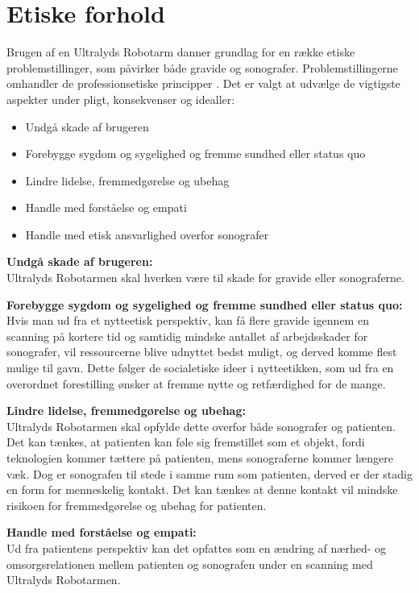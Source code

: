 \section{Etiske forhold}
Brugen af en Ultralyds Robotarm danner grundlag for en række etiske problemstillinger, som påvirker både gravide og sonografer. 
Problemstillingerne omhandler de professionsetiske principper \cite{Husted}. Det er valgt at udvælge de vigtigste aspekter under pligt, konsekvenser og idealler: 
\begin{itemize}
		\item Undgå skade af brugeren
		\item Forebygge sygdom og sygelighed og fremme sundhed eller status quo
		\item Lindre lidelse, fremmedgørelse og ubehag
		\item Handle med forståelse og empati
		\item Handle med etisk ansvarlighed overfor sonografer 
\end{itemize} 

\textbf{Undgå skade af brugeren:} \\
Ultralyds Robotarmen skal hverken være til skade for gravide eller sonograferne.

\textbf{Forebygge sygdom og sygelighed og fremme sundhed eller status quo:} \\
Hvis man ud fra et nytteetisk perspektiv, kan få flere gravide igennem en scanning på kortere tid og samtidig mindske antallet af arbejdsskader for sonografer, vil ressourcerne blive udnyttet bedst muligt, og derved komme flest mulige til gavn. Dette følger de socialetiske ideer i nytteetikken, som ud fra en overordnet forestilling ønsker at fremme nytte og retfærdighed for de mange.
    
\textbf{Lindre lidelse, fremmedgørelse og ubehag:}\\
Ultralyds Robotarmen skal opfylde dette overfor både sonografer og patienten. Det kan tænkes, at patienten kan føle sig fremstillet som et objekt, fordi teknologien kommer tættere på patienten, mens sonograferne kommer længere væk. Dog er sonografen til stede i samme rum som patienten, derved er der stadig en form for menneskelig kontakt. Det kan tænkes at denne kontakt vil mindske risikoen for fremmedgørelse og ubehag for patienten.   

\textbf{Handle med forståelse og empati:}\\
Ud fra patientens perspektiv kan det opfattes som en ændring af nærhed- og omsorgsrelationen mellem patienten og sonografen under en scanning med Ultralyds Robotarmen. 

